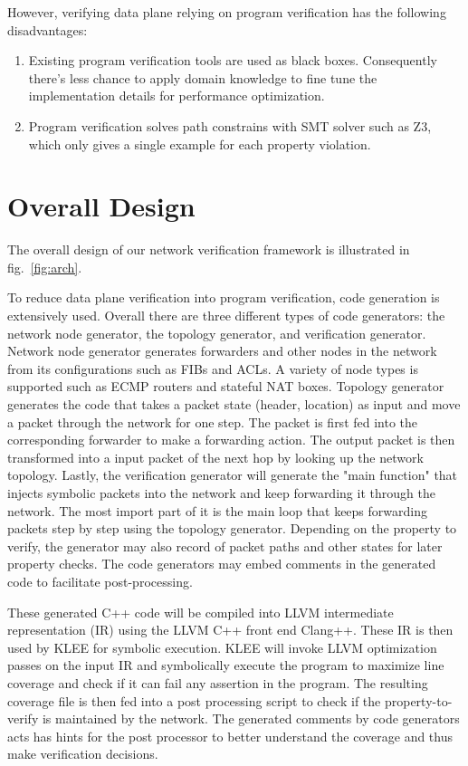 \documentclass[letterpaper, 10 pt, conference]{ieeeconf}  %
\begin{document}
However, verifying data plane relying on program verification has the following disadvantages:

\begin{enumerate}
 \item Existing program verification tools are used as black boxes. Consequently there's less chance to apply domain knowledge to fine tune the implementation details for performance optimization.
 \item Program verification solves path constrains with SMT solver such as Z3, which only gives a single example for each property violation.
\end{enumerate}

\section{Overall Design}\label{sec:overall}
The overall design of our network verification framework is illustrated in fig.~\ref{fig:arch}. 

To reduce data plane verification into program verification, code generation is extensively used. Overall there are three different types of code generators: the network node generator, the topology generator, and verification generator. Network node generator generates forwarders and other nodes in the network from its configurations such as FIBs and ACLs. A variety of node types is supported such as ECMP routers and stateful NAT boxes. Topology generator generates the code that takes a packet state (header, location) as input and move a packet through the network for one step. The packet is first fed into the corresponding forwarder to make a forwarding action. The output packet is then transformed into a input packet of the next hop by looking up the network topology. Lastly, the verification generator will generate the "main function" that injects symbolic packets into the network and keep forwarding it through the network. The most import part of it is the main loop that keeps forwarding packets step by step using the topology generator. Depending on the property to verify, the generator may also record of packet paths and other states for later property checks. The code generators may embed comments in the generated code to facilitate post-processing.

These generated C++ code will be compiled into LLVM intermediate representation (IR) using the LLVM C++ front end Clang++. These IR is then used by KLEE for symbolic execution. KLEE will invoke LLVM optimization passes on the input IR and symbolically execute the program to maximize line coverage and check if it can fail any assertion in the program. The resulting coverage file is then fed into a post processing script to check if the property-to-verify is maintained by the network. The generated comments by code generators acts has hints for the post processor to better understand the coverage and thus make verification decisions.
\end{document}
